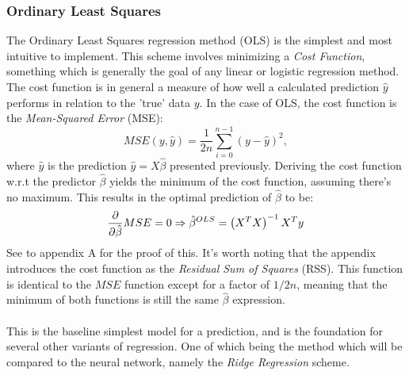         \subsubsection{Ordinary Least Squares}
            The Ordinary Least Squares regression method (OLS) is the simplest and most intuitive to implement. This scheme involves minimizing a \textit{Cost Function}, something which is generally the goal of any linear or logistic regression method. The cost function is in general a measure of how well a calculated prediction $\hat{y}$ performs in relation to the 'true' data $y$. In the case of OLS, the cost function is the \textit{Mean-Squared Error} (MSE):
            \begin{equation}\label{eq:MSE}
                MSE(y, \hat{y})=\frac1{2n}\sum_{i=0}^{n-1} \left( y-\hat{y} \right)^2,
            \end{equation}
            where $\hat{y}$ is the prediction $\hat{y}=X\hat{\beta}$ presented previously. Deriving the cost function w.r.t the predictor $\hat{\beta}$ yields the minimum of the cost function, assuming there's no maximum. This results in the optimal prediction of $\hat{\beta}$ to be:
            \begin{equation}
                \pdv{}{\hat{\beta}}MSE=0\Rightarrow \hat{\beta}^{OLS} = \left( X^TX \right)^{-1}X^Ty
            \end{equation}
            See to appendix A 
			for the proof of this. It's worth noting that the appendix introduces the cost function as the \textit{Residual Sum of Squares} (RSS). This function is identical to the $MSE$ function except for a factor of $1/2n$, meaning that the minimum of both functions is still the same $\hat{\beta}$ expression. \\\\
            This is the baseline simplest model for a prediction, and is the foundation for several other variants of regression. One of which being the method which will be compared to the neural network, namely the \textit{Ridge Regression} scheme.
            
